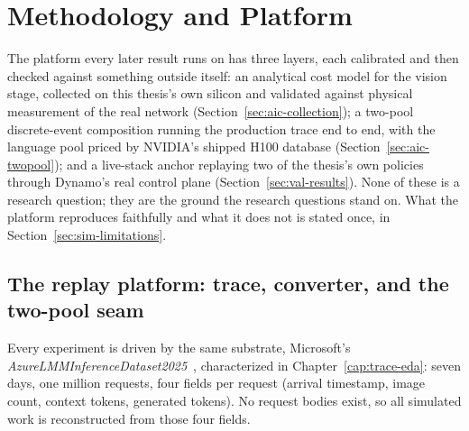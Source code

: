 \chapter{Methodology and Platform}
\label{cap:metodologia}%
\label{cap:aiconfigurator}%
\label{cap:twopool}%
\label{cap:validation}%

The platform every later result runs on has three layers, each calibrated and
then checked
against something outside itself: an analytical cost model for the vision
stage, collected on this thesis's own silicon and validated against physical
measurement of the real network (Section~\ref{sec:aic-collection}); a
two-pool discrete-event composition running the production trace end to end,
with the language pool priced by NVIDIA's shipped H100 database
(Section~\ref{sec:aic-twopool}); and a live-stack anchor replaying two of
the thesis's own policies through Dynamo's real control plane
(Section~\ref{sec:val-results}). None of these is a research question; they
are the ground the research questions stand on. What the platform reproduces
faithfully and what it does not is stated once, in
Section~\ref{sec:sim-limitations}.

\section{The replay platform: trace, converter, and the two-pool seam}
\label{sec:sim-arch}

Every experiment is driven by the same substrate, Microsoft's
\textit{AzureLMMInferenceDataset2025}~\cite{AzureLMM2025}, characterized in
Chapter~\ref{cap:trace-eda}: seven days, one million requests, four fields
per request (arrival timestamp, image count, context tokens, generated
tokens). No request bodies exist, so all simulated work is reconstructed
from those four fields.

